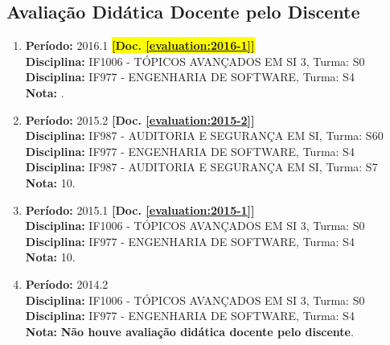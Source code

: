 \documentclass[a4paper,oneside,10pt]{article}
\begin{document}
\vspace{5.0cm}
\subsection{Avaliação Didática Docente pelo Discente}
\vspace{0.3cm}


\begin{enumerate}
\renewcommand{\labelenumi}{{\large\bfseries\arabic{enumi}.}}

\item   \textbf{Período:} 2016.1 \colorbox{yellow}{\textbf{[Doc. \ref{evaluation:2016-1}]}}\\
        \textbf{Disciplina:} IF1006 - TÓPICOS AVANÇADOS EM SI 3, Turma: S0\\
        \textbf{Disciplina:} IF977 - ENGENHARIA DE SOFTWARE, Turma: S4\\
        \textbf{Nota:} .

\item   \textbf{Período:} 2015.2 \textbf{[Doc. \ref{evaluation:2015-2}]}\\
        \textbf{Disciplina:} IF987 - AUDITORIA E SEGURANÇA EM SI, Turma: S60\\
        \textbf{Disciplina:} IF977 - ENGENHARIA DE SOFTWARE, Turma: S4\\
        \textbf{Disciplina:} IF987 - AUDITORIA E SEGURANÇA EM SI, Turma: S7\\
        \textbf{Nota:} 10.

\item   \textbf{Período:} 2015.1 \textbf{[Doc. \ref{evaluation:2015-1}]}\\
        \textbf{Disciplina:} IF1006 - TÓPICOS AVANÇADOS EM SI 3, Turma: S0\\
        \textbf{Disciplina:} IF977 - ENGENHARIA DE SOFTWARE, Turma: S4\\
        \textbf{Nota:} 10.

\item   \textbf{Período:} 2014.2 \\
        \textbf{Disciplina:} IF1006 - TÓPICOS AVANÇADOS EM SI 3, Turma: S0\\
        \textbf{Disciplina:} IF977 - ENGENHARIA DE SOFTWARE, Turma: S4\\
        \textbf{Nota:} \textbf{Não houve avaliação didática docente pelo discente}.

\end{enumerate}
\end{document}
